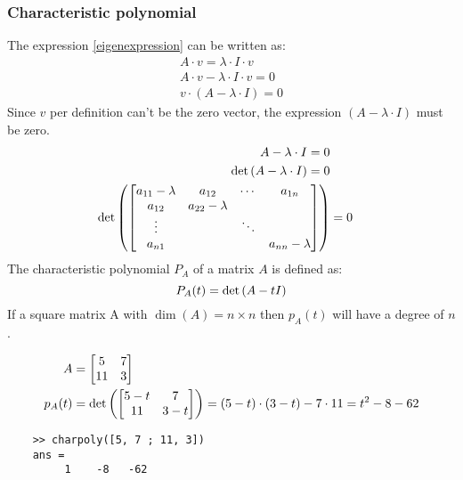 \subsubsection{Characteristic polynomial}
The expression \ref{eigenexpression} can be written as:
\begin{align}
    A\cdot v = \lambda \cdot I \cdot v \tag*{Multiplying with identity Matrix} \\
    A \cdot v - \lambda \cdot I \cdot v = 0                                    \\
    v \cdot (A - \lambda \cdot I) = 0
\end{align}
Since \(v\) per definition can't be the zero vector, the expression \( (A - \lambda \cdot I) \) must be zero.
\begin{align*}
    A - \lambda \cdot I = 0                 \\
    \det \left(  A - \lambda \cdot I  \right) = 0 \\
    \det \left( 
        \begin{bmatrix}
            a_{11} - \lambda & a_{12}           & \cdots & a_{1n}           \\
            a_{12}           & a_{22} - \lambda &        &                  \\
            \vdots           &                  & \ddots &                  \\
            a_{n1}           &                  &        & a_{nn} - \lambda
        \end{bmatrix}
     \right) & = 0
\end{align*}
The characteristic polynomial \( P_{A}\) of a matrix \(A\) is defined as:
\begin{equation}
    P_A(t) = \det \left( A - t I \right)
\end{equation}
If a square matrix A with \( \dim(A) = n \times n \) then \(p_A(t)\) will have a degree of \(n\).
\begin{example}\label{eigenexample}
    \begin{align*}
        A      & = \begin{bmatrix}
            5 & 7 \\ 11 & 3
        \end{bmatrix}                                                                   \\
        p_A(t) & = \det \left( \begin{bmatrix}
                5 - t & 7 \\ 11 & 3 -t
            \end{bmatrix} \right) = (5 - t) \cdot (3 - t) - 7 \cdot 11 = t^2 - 8 - 62
    \end{align*}
\end{example}
\begin{matlab}
    \begin{lstlisting}
    >> charpoly([5, 7 ; 11, 3])
    ans =
         1    -8   -62
   \end{lstlisting}
\end{matlab}
